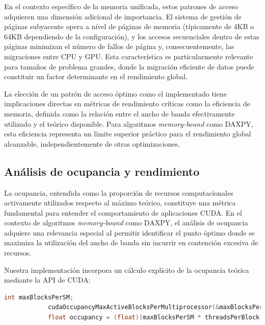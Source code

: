         En el contexto específico de la memoria unificada, estos patrones de acceso adquieren una dimensión adicional de importancia. El sistema de gestión de páginas subyacente opera a nivel de páginas de memoria (típicamente de 4KB o 64KB dependiendo de la configuración), y los accesos secuenciales dentro de estas páginas minimizan el número de fallos de página y, consecuentemente, las migraciones entre CPU y GPU. Esta característica es particularmente relevante para tamaños de problema grandes, donde la migración eficiente de datos puede constituir un factor determinante en el rendimiento global.
        
        La elección de un patrón de acceso óptimo como el implementado tiene implicaciones directas en métricas de rendimiento críticas como la eficiencia de memoria, definida como la relación entre el ancho de banda efectivamente utilizado y el teórico disponible. Para algoritmos \textit{ memory-bound} como DAXPY, esta eficiencia representa un límite superior práctico para el rendimiento global alcanzable, independientemente de otras optimizaciones.
        
    \subsection{Análisis de ocupancia y rendimiento}
    
        La ocupancia, entendida como la proporción de recursos computacionales activamente utilizados respecto al máximo teórico, constituye una métrica fundamental para entender el comportamiento de aplicaciones CUDA. En el contexto de algoritmos \textit{memory-bound} como DAXPY, el análisis de ocupancia adquiere una relevancia especial al permitir identificar el punto óptimo donde se maximiza la utilización del ancho de banda sin incurrir en contención excesiva de recursos.
    
        Nuestra implementación incorpora un cálculo explícito de la ocupancia teórica mediante la API de CUDA:
        
        \begin{lstlisting}[language=C, caption={Calculo de ocupancia teorica.}, gobble=8]
            int maxBlocksPerSM;
            cudaOccupancyMaxActiveBlocksPerMultiprocessor(&maxBlocksPerSM, daxpy, threadsPerBlock, 0);
            float occupancy = (float)(maxBlocksPerSM * threadsPerBlock / 32) / (float)(prop.maxThreadsPerMultiProcessor / 32);
        \end{lstlisting}
        
